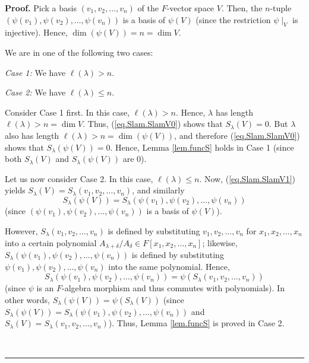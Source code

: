 \documentclass[numbers=enddot,12pt,final,onecolumn,notitlepage]{scrartcl}%
\numberwithin{exer}{section}
\theoremstyle{definition}
\newenvironment{proof}[1][Proof]{\noindent\textbf{#1.} }{\ \rule{0.5em}{0.5em}}
\theoremstyle{plainsl}
\begin{document}
\begin{proof}
Pick a basis $\left(  v_{1},v_{2},\ldots,v_{n}\right)  $ of the $F$-vector
space $V$. Then, the $n$-tuple $\left(  \psi\left(  v_{1}\right)  ,\psi\left(
v_{2}\right)  ,\ldots,\psi\left(  v_{n}\right)  \right)  $ is a basis of
$\psi\left(  V\right)  $ (since the restriction $\psi\mid_{V}$ is injective).
Hence, $\dim\left(  \psi\left(  V\right)  \right)  =n=\dim V$.

We are in one of the following two cases:

\textit{Case 1:} We have $\ell\left(  \lambda\right)  >n$.

\textit{Case 2:} We have $\ell\left(  \lambda\right)  \leq n$.

Consider Case 1 first. In this case, $\ell\left(  \lambda\right)  >n$. Hence,
$\lambda$ has length $\ell\left(  \lambda\right)  >n=\dim V$. Thus,
(\ref{eq.Slam.SlamV0}) shows that $S_{\lambda}\left(  V\right)  =0$. But
$\lambda$ also has length $\ell\left(  \lambda\right)  >n=\dim\left(
\psi\left(  V\right)  \right)  $, and therefore (\ref{eq.Slam.SlamV0}) shows
that $S_{\lambda}\left(  \psi\left(  V\right)  \right)  =0$. Hence, Lemma
\ref{lem.funcS} holds in Case 1 (since both $S_{\lambda}\left(  V\right)  $
and $S_{\lambda}\left(  \psi\left(  V\right)  \right)  $ are $0$).

Let us now consider Case 2. In this case, $\ell\left(  \lambda\right)  \leq
n$. Now, (\ref{eq.Slam.SlamV1}) yields $S_{\lambda}\left(  V\right)
=S_{\lambda}\left(  v_{1},v_{2},\ldots,v_{n}\right)  $, and similarly%
\[
S_{\lambda}\left(  \psi\left(  V\right)  \right)  =S_{\lambda}\left(
\psi\left(  v_{1}\right)  ,\psi\left(  v_{2}\right)  ,\ldots,\psi\left(
v_{n}\right)  \right)
\]
(since $\left(  \psi\left(  v_{1}\right)  ,\psi\left(  v_{2}\right)
,\ldots,\psi\left(  v_{n}\right)  \right)  $ is a basis of $\psi\left(
V\right)  $).

However, $S_{\lambda}\left(  v_{1},v_{2},\ldots,v_{n}\right)  $ is defined by
substituting $v_{1},v_{2},\ldots,v_{n}$ for $x_{1},x_{2},\ldots,x_{n}$ into a
certain polynomial $A_{\lambda+\delta}/A_{\delta}\in F\left[  x_{1}%
,x_{2},\ldots,x_{n}\right]  $; likewise, \newline$S_{\lambda}\left(
\psi\left(  v_{1}\right)  ,\psi\left(  v_{2}\right)  ,\ldots,\psi\left(
v_{n}\right)  \right)  $ is defined by substituting $\psi\left(  v_{1}\right)
,\psi\left(  v_{2}\right)  ,\ldots,\psi\left(  v_{n}\right)  $ into the same
polynomial. Hence,
\[
S_{\lambda}\left(  \psi\left(  v_{1}\right)  ,\psi\left(  v_{2}\right)
,\ldots,\psi\left(  v_{n}\right)  \right)  =\psi\left(  S_{\lambda}\left(
v_{1},v_{2},\ldots,v_{n}\right)  \right)
\]
(since $\psi$ is an $F$-algebra morphism and thus commutes with polynomials).
In other words, $S_{\lambda}\left(  \psi\left(  V\right)  \right)
=\psi\left(  S_{\lambda}\left(  V\right)  \right)  $ (since $S_{\lambda
}\left(  \psi\left(  V\right)  \right)  =S_{\lambda}\left(  \psi\left(
v_{1}\right)  ,\psi\left(  v_{2}\right)  ,\ldots,\psi\left(  v_{n}\right)
\right)  $ and $S_{\lambda}\left(  V\right)  =S_{\lambda}\left(  v_{1}%
,v_{2},\ldots,v_{n}\right)  $). Thus, Lemma \ref{lem.funcS} is proved in Case 2.


\end{proof}
\end{document}
